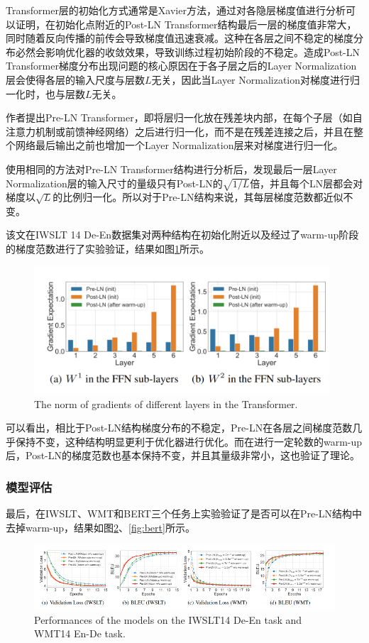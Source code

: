 Transformer层的初始化方式通常是Xavier方法，通过对各隐层梯度值进行分析可以证明，在初始化点附近的Post-LN Transformer结构最后一层的梯度值非常大，同时随着反向传播的前传会导致梯度值迅速衰减。这种在各层之间不稳定的梯度分布必然会影响优化器的收敛效果，导致训练过程初始阶段的不稳定。造成Post-LN Transformer梯度分布出现问题的核心原因在于各子层之后的Layer Normalization层会使得各层的输入尺度与层数\(L\)无关，因此当Layer Normalization对梯度进行归一化时，也与层数\(L\)无关。

作者提出Pre-LN Transformer，即将层归一化放在残差块内部，在每个子层（如自注意力机制或前馈神经网络）之后进行归一化，而不是在残差连接之后，并且在整个网络最后输出之前也增加一个Layer Normalization层来对梯度进行归一化。

使用相同的方法对Pre-LN Transformer结构进行分析后，发现最后一层Layer Normalization层的输入尺寸的量级只有Post-LN的\(\sqrt{1/L}\)倍，并且每个LN层都会对梯度以\(\sqrt{L}\)的比例归一化。所以对于Pre-LN结构来说，其每层梯度范数都近似不变。

该文在IWSLT 14 De-En数据集对两种结构在初始化附近以及经过了warm-up阶段的梯度范数进行了实验验证，结果如图\ref{fig:gradients}所示。
\begin{figure}[h]
    \centering
    \includegraphics[width=11cm]{img/LN/LN-3.jpg}
    \caption{The norm of gradients of different layers in the Transformer.}
    \label{fig:gradients}
\end{figure}

可以看出，相比于Post-LN结构梯度分布的不稳定，Pre-LN在各层之间梯度范数几乎保持不变，这种结构明显更利于优化器进行优化。而在进行一定轮数的warm-up后，Post-LN的梯度范数也基本保持不变，并且其量级非常小，这也验证了理论。

\subsubsection{模型评估}

最后，在IWSLT、WMT和BERT三个任务上实验验证了是否可以在Pre-LN结构中去掉warm-up，结果如图\ref{fig:iwslt-wmt5}、\ref{fig:bert}所示。
\begin{figure}[h]
    \centering
    \includegraphics[width=\textwidth]{img/LN/LN-4.jpg}
    \caption{Performances of the models on the IWSLT14 De-En task and WMT14 En-De task.}
    \label{fig:iwslt-wmt5}
\end{figure}

